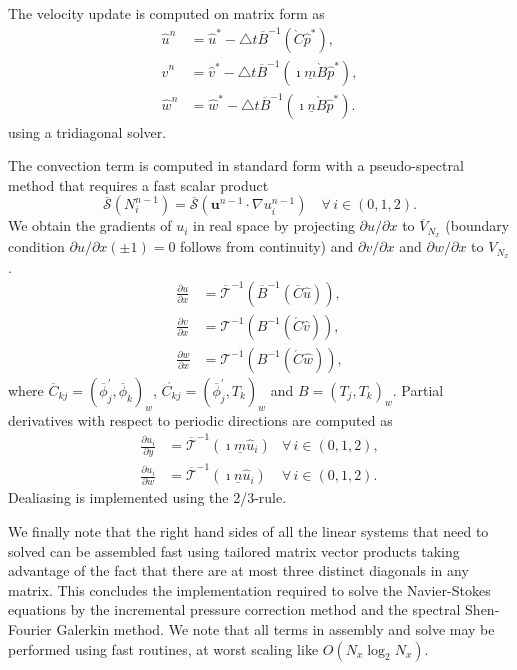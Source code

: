 \documentclass[11pt, oneside]{article}
\newcommand{\D}[1]{\overline{#1}}
\begin{document}
The velocity update is computed on matrix form as
\begin{align}
  \hat{u}^n &= \hat{u}^* - \triangle t \D{B}^{-1} \left( \grave{C} \hat{p}^* \right),\\
  \hat{v}^n &= \hat{v}^* - \triangle t \D{B}^{-1} \left( \imath \underline{m} \grave{B} \hat{p}^* \right),\\ 
  \hat{w}^n &= \hat{w}^* - \triangle t \D{B}^{-1} \left( \imath \underline{n} \grave{B} \hat{p}^* \right).
\end{align}
using a tridiagonal solver.

The convection term is computed in standard form with a pseudo-spectral method that requires a fast scalar product
\begin{equation}
  \D{\mathcal{S}}(N_i^{n-1}) = \D{\mathcal{S}}(\bm{u}^{n-1} \cdot \nabla u_i^{n-1}) \quad \forall \, i \in (0, 1, 2).
\end{equation}
We obtain the gradients of $u_i$ in real space by projecting $\partial u/\partial x$ to $\D{V}_{N_x}$ (boundary condition $\partial u/\partial x(\pm 1)=0$ follows from continuity) and $\partial v/\partial x$ and $\partial w/\partial x$ to $V_{N_x}$. 
\begin{align}
  \frac{\partial u}{\partial x} &= \D{\mathcal{T}}^{-1} (\D{B}^{-1}(\D{C}\hat{u})), \\
  \frac{\partial v}{\partial x} &= \mathcal{T}^{-1} (B^{-1}(\acute{C}\hat{v})), \\
  \frac{\partial w}{\partial x} &= \mathcal{T}^{-1} (B^{-1}(\acute{C}\hat{w})),  
\end{align}
where $\D{C}_{kj} = (\D{\phi}_j^{'}, \D{\phi}_k)_w$,  $\acute{C_{kj}} = (\D{\phi}_j^{'}, T_k)_w$ and $B=(T_j, T_k)_w$. Partial derivatives with respect to periodic directions are computed as
\begin{align}
 \frac{\partial u_i}{\partial y} &= \D{\mathcal{T}}^{-1}(\imath \underline{m} \hat{u}_i) &\forall \, i \in (0, 1, 2), \\
 \frac{\partial u_i}{\partial w} &= \D{\mathcal{T}}^{-1}(\imath \underline{n} \hat{u}_i) &\forall \, i \in (0, 1, 2).
\end{align}
Dealiasing is implemented using the 2/3-rule.

We finally note that the right hand sides of all the linear systems that need to solved can be assembled fast using tailored matrix vector products taking advantage of the fact that there are at most three distinct diagonals in any matrix. This concludes the implementation required to solve the Navier-Stokes equations by the incremental pressure correction method and the spectral Shen-Fourier Galerkin method. We note that all terms in assembly and solve may be performed using fast routines, at worst scaling like $O(N_x \log_2 N_x)$. 
\end{document}
